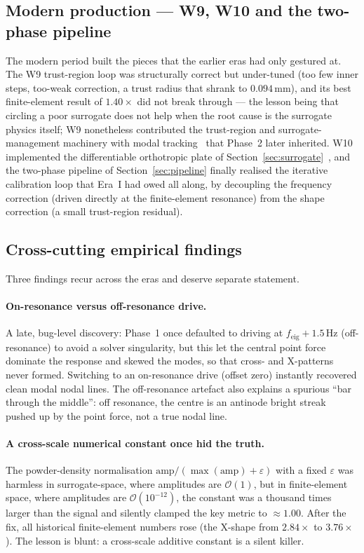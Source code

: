 \documentclass[11pt,a4paper]{article}
\begin{document}
\subsection{Modern production --- W9, W10 and the two-phase pipeline}\label{sec:modern}
The modern period built the pieces that the earlier eras had only gestured at. The
W9 trust-region loop was structurally correct but under-tuned (too few inner
steps, too-weak correction, a trust radius that shrank to $0.094\,\text{mm}$), and
its best finite-element result of $1.40\times$ did not break through --- the lesson
being that circling a poor surrogate does not help when the root cause is the
surrogate physics itself; W9 nonetheless contributed the trust-region and
surrogate-management machinery with modal tracking~%
\cite{conn2000,booker1999,allemang1982} that Phase~2 later inherited. W10
implemented the differentiable orthotropic plate of
Section~\ref{sec:surrogate}~\cite{reddy2003}, and the two-phase pipeline of
Section~\ref{sec:pipeline} finally realised the iterative calibration loop that
Era~I had owed all along, by decoupling the frequency correction (driven directly
at the finite-element resonance) from the shape correction (a small trust-region
residual).

\subsection{Cross-cutting empirical findings}\label{sec:crosscut}
Three findings recur across the eras and deserve separate statement.

\paragraph{On-resonance versus off-resonance drive.}
A late, bug-level discovery: Phase~1 once defaulted to driving at
$f_{\text{eig}}+1.5\,\text{Hz}$ (off-resonance) to avoid a solver singularity, but
this let the central point force dominate the response and skewed the modes, so
that cross- and X-patterns never formed. Switching to an on-resonance drive
(offset zero) instantly recovered clean modal nodal lines. The off-resonance
artefact also explains a spurious ``bar through the middle'': off resonance, the
centre is an antinode bright streak pushed up by the point force, not a true nodal
line.

\paragraph{A cross-scale numerical constant once hid the truth.}
The powder-density normalisation $\text{amp}/(\max(\text{amp})+\varepsilon)$ with a
fixed $\varepsilon$ was harmless in surrogate-space, where amplitudes are
$\mathcal{O}(1)$, but in finite-element space, where amplitudes are
$\mathcal{O}(10^{-12})$, the constant was a thousand times larger than the signal
and silently clamped the key metric to $\approx 1.00$. After the fix, all
historical finite-element numbers rose (the X-shape from $2.84\times$ to
$3.76\times$). The lesson is blunt: a cross-scale additive constant is a silent
killer.
\end{document}
